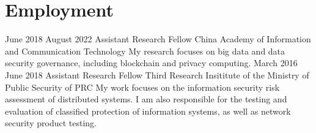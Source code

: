     \section{Employment}
        \position
            {June 2018 \textemdash{} August 2022}
            {Assistant Research Fellow}
            {China Academy of Information and Communication Technology}
            {My research focuses on big data and data security governance, including blockchain and privacy computing.}
        \position
            {March 2016 \textemdash{} June 2018}
            {Assistant Research Fellow}
            {Third Research Insititute of the Ministry of Public Security of PRC}
            {My work focuses on the information security risk assessment of distributed systems. I am also responsible for the testing and evaluation of classified protection of information systems, as well as network security product testing.}
\fi
